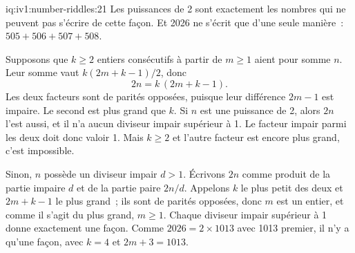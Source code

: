 \begin{solution}{iq:iv1:number-riddles:21}
Les puissances de 2 sont exactement les nombres qui ne peuvent pas s'écrire de cette façon. Et 2026 ne s'écrit que d'une seule manière~: $505 + 506 + 507 + 508$.

Supposons que $k \geq 2$ entiers consécutifs à partir de $m \geq 1$ aient pour somme $n$. Leur somme vaut $k(2m + k - 1)/2$, donc
\[
2n = k \, (2m + k - 1).
\]
Les deux facteurs sont de parités opposées, puisque leur différence $2m - 1$ est impaire. Le second est plus grand que $k$. Si $n$ est une puissance de 2, alors $2n$ l'est aussi, et il n'a aucun diviseur impair supérieur à 1. Le facteur impair parmi les deux doit donc valoir 1. Mais $k \geq 2$ et l'autre facteur est encore plus grand, c'est impossible.

Sinon, $n$ possède un diviseur impair $d > 1$. Écrivons $2n$ comme produit de la partie impaire $d$ et de la partie paire $2n/d$. Appelons $k$ le plus petit des deux et $2m + k - 1$ le plus grand~; ils sont de parités opposées, donc $m$ est un entier, et comme il s'agit du plus grand, $m \ge 1$. Chaque diviseur impair supérieur à 1 donne exactement une façon. Comme $2026 = 2 \times 1013$ avec 1013 premier, il n'y a qu'une façon, avec $k = 4$ et $2m + 3 = 1013$.

\end{solution}

